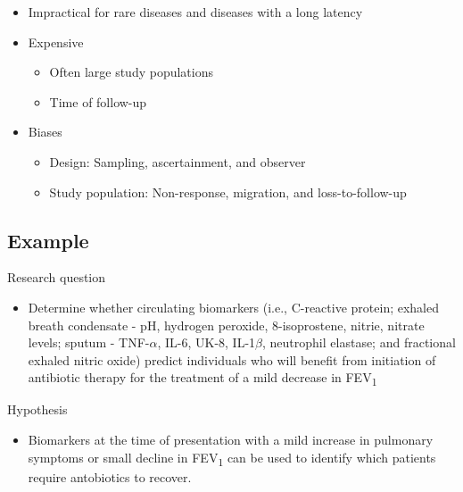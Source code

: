 \documentclass[
]{book}
\providecommand{\tightlist}{%
  \setlength{\itemsep}{0pt}\setlength{\parskip}{0pt}}
\begin{document}
\begin{itemize}
\tightlist
\item
  Impractical for rare diseases and diseases with a long latency
\item
  Expensive

  \begin{itemize}
  \tightlist
  \item
    Often large study populations
  \item
    Time of follow-up
  \end{itemize}
\item
  Biases

  \begin{itemize}
  \tightlist
  \item
    Design: Sampling, ascertainment, and observer
  \item
    Study population: Non-response, migration, and loss-to-follow-up
  \end{itemize}
\end{itemize}

\hypertarget{example-2}{%
\subsection{Example}\label{example-2}}

Research question

\begin{itemize}
\tightlist
\item
  Determine whether circulating biomarkers (i.e., C-reactive protein; exhaled breath condensate - pH, hydrogen peroxide, 8-isoprostene, nitrie, nitrate levels; sputum - TNF-\(\alpha\), IL-6, UK-8, IL-1\(\beta\), neutrophil elastase; and fractional exhaled nitric oxide) predict individuals who will benefit from initiation of antibiotic therapy for the treatment of a mild decrease in FEV\textsubscript{1}
\end{itemize}

Hypothesis

\begin{itemize}
\tightlist
\item
  Biomarkers at the time of presentation with a mild increase in pulmonary symptoms or small decline in FEV\textsubscript{1} can be used to identify which patients require antobiotics to recover.
\end{itemize}
\end{document}

